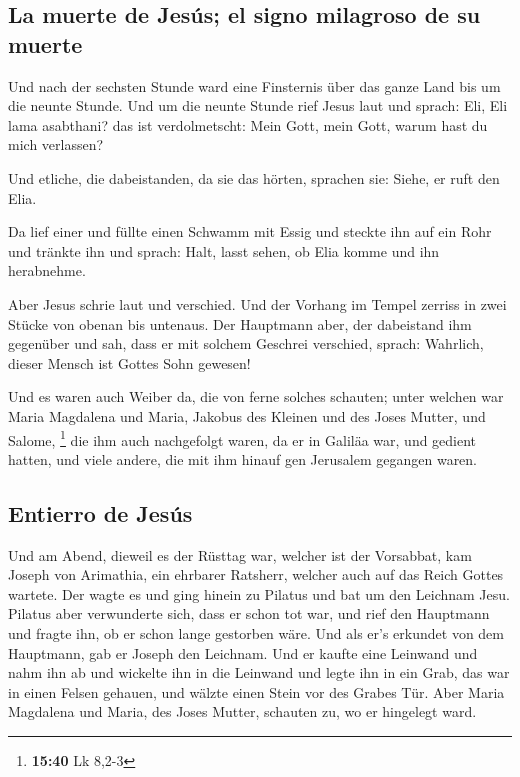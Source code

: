 \hypertarget{la-muerte-de-jesuxfas-el-signo-milagroso-de-su-muerte}{%
\subsection{La muerte de Jesús; el signo milagroso de su
muerte}\label{la-muerte-de-jesuxfas-el-signo-milagroso-de-su-muerte}}

 Und nach der sechsten Stunde ward eine Finsternis über
das ganze Land bis um die neunte Stunde.  Und um die
neunte Stunde rief Jesus laut und sprach: Eli, Eli lama asabthani? das
ist verdolmetscht: Mein Gott, mein Gott, warum hast du mich verlassen?

 Und etliche, die dabeistanden, da sie das hörten,
sprachen sie: Siehe, er ruft den Elia.

 Da lief einer und füllte einen Schwamm mit Essig und
steckte ihn auf ein Rohr und tränkte ihn und sprach: Halt, lasst sehen,
ob Elia komme und ihn herabnehme.

 Aber Jesus schrie laut und verschied. 
Und der Vorhang im Tempel zerriss in zwei Stücke von obenan bis
untenaus.  Der Hauptmann aber, der dabeistand ihm
gegenüber und sah, dass er mit solchem Geschrei verschied, sprach:
Wahrlich, dieser Mensch ist Gottes Sohn gewesen!

 Und es waren auch Weiber da, die von ferne solches
schauten; unter welchen war Maria Magdalena und Maria, Jakobus des
Kleinen und des Joses Mutter, und Salome, \footnote{\textbf{15:40} Lk
  8,2-3}  die ihm auch nachgefolgt waren, da er in
Galiläa war, und gedient hatten, und viele andere, die mit ihm hinauf
gen Jerusalem gegangen waren.

\hypertarget{entierro-de-jesuxfas}{%
\subsection{Entierro de Jesús}\label{entierro-de-jesuxfas}}

 Und am Abend, dieweil es der Rüsttag war, welcher ist
der Vorsabbat,  kam Joseph von Arimathia, ein ehrbarer
Ratsherr, welcher auch auf das Reich Gottes wartete. Der wagte es und
ging hinein zu Pilatus und bat um den Leichnam Jesu. 
Pilatus aber verwunderte sich, dass er schon tot war, und rief den
Hauptmann und fragte ihn, ob er schon lange gestorben wäre.
 Und als er's erkundet von dem Hauptmann, gab er Joseph
den Leichnam.  Und er kaufte eine Leinwand und nahm ihn
ab und wickelte ihn in die Leinwand und legte ihn in ein Grab, das war
in einen Felsen gehauen, und wälzte einen Stein vor des Grabes Tür.
 Aber Maria Magdalena und Maria, des Joses Mutter,
schauten zu, wo er hingelegt ward.

